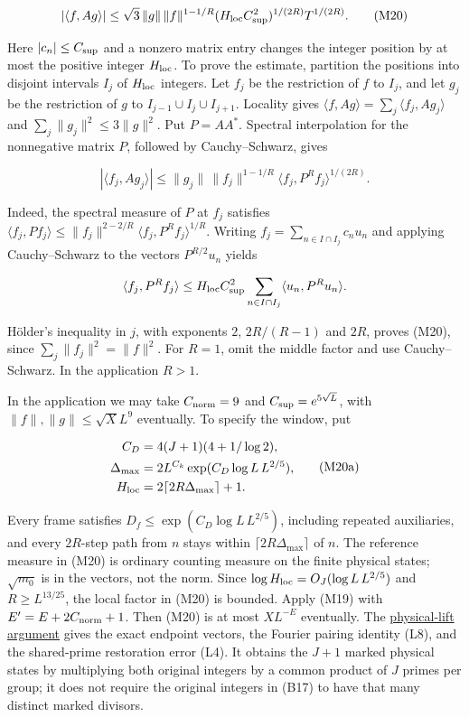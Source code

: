 \[
|\langle f,Ag\rangle|
\le\sqrt3\,\|g\|\,\|f\|^{1-1/R}
 (H_{\rm loc}C_{\rm sup}^2)^{1/(2R)}T^{1/(2R)}. \tag{M20}
\]

Here \(|c_n|\le C_{\rm sup}\) and a nonzero matrix entry changes the
integer position by at most the positive integer \(H_{\rm loc}\). To
prove the estimate, partition the positions into disjoint intervals
\(I_j\) of \(H_{\rm loc}\) integers. Let \(f_j\) be the restriction of
\(f\) to \(I_j\), and let \(g_j\) be the restriction of \(g\) to
\(I_{j-1}\cup I_j\cup I_{j+1}\). Locality gives
\(\langle f,Ag\rangle=\sum_j\langle f_j,Ag_j\rangle\) and
\(\sum_j\|g_j\|^2\le3\|g\|^2\). Put \(P=AA^*\). Spectral interpolation
for the nonnegative matrix \(P\), followed by Cauchy--Schwarz, gives

\[
|\langle f_j,Ag_j\rangle|
 \le\|g_j\|\,\|f_j\|^{1-1/R}
            \langle f_j,P^Rf_j\rangle^{1/(2R)}.
\]

Indeed, the spectral measure of \(P\) at \(f_j\) satisfies
\(\langle f_j,Pf_j\rangle\le \|f_j\|^{2-2/R}\langle f_j,P^Rf_j\rangle^{1/R}\).
Writing \(f_j=\sum_{n\in I\cap I_j}c_nu_n\) and applying Cauchy--Schwarz
to the vectors \(P^{R/2}u_n\) yields

\[
\langle f_j,P^Rf_j\rangle
 \le H_{\rm loc}C_{\rm sup}^2
       \sum_{n\in I\cap I_j}\langle u_n,P^Ru_n\rangle.
\]

Hölder's inequality in \(j\), with exponents \(2\), \(2R/(R-1)\) and
\(2R\), proves (M20), since \(\sum_j\|f_j\|^2=\|f\|^2\). For \(R=1\),
omit the middle factor and use Cauchy--Schwarz. In the application
\(R>1\).

In the application we may take \(C_{\rm norm}=9\) and
\(C_{\rm sup}=e^{5\sqrt L}\), with \(\|f\|,\|g\|\le\sqrt X L^9\)
eventually. To specify the window, put

\[
\begin{aligned}
C_D&=4(J+1)(4+1/\log2),\\
\Delta_{\max}&=2L^{C_k}\exp(C_D\log L\,L^{2/5}),\\
H_{\rm loc}&=2\lceil2R\Delta_{\max}\rceil+1.
\end{aligned}\tag{M20a}
\]

Every frame satisfies \(D_f\le\exp(C_D\log L\,L^{2/5})\), including
repeated auxiliaries, and every \(2R\)-step path from \(n\) stays within
\(\lceil2R\Delta_{\max}\rceil\) of \(n\). The reference measure in (M20)
is ordinary counting measure on the finite physical states;
\(\sqrt{m_0}\) is in the vectors, not the norm. Since
\(\log H_{\rm loc}=O_J(\log L\,L^{2/5})\) and \(R\ge L^{13/25}\), the
local factor in (M20) is bounded. Apply (M19) with
\(E'=E+2C_{\rm norm}+1\). Then (M20) is at most \(XL^{-E}\) eventually.
The \protect\hyperlink{physical-lift}{physical-lift argument} gives the
exact endpoint vectors, the Fourier pairing identity (L8), and the
shared-prime restoration error (L4). It obtains the \(J+1\) marked
physical states by multiplying both original integers by a common
product of \(J\) primes per group; it does not require the original
integers in (B17) to have that many distinct marked divisors.

